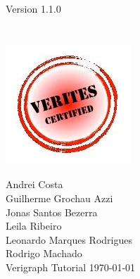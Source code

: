 \documentclass[12pt]{article}
\newcommand{\verigraphversion}[0]{1.1.0}
\begin{document}
\begin{titlepage}
Version \verigraphversion \\[0.4cm] %
\HRule \\[1.0cm]
 




\center {\today}\\[2cm]
\includegraphics[scale = 0.7]{img/logos/LogoVerites.jpg}

 

\begin{titlepage}
\vfill
\begin{flushleft} 
{\large Andrei Costa \\
Guilherme Grochau Azzi \\
Jonas Santos Bezerra \\
Leila Ribeiro \\
Leonardo Marques Rodrigues \\
Rodrigo Machado } \\ [5cm] 
{\Huge Verigraph Tutorial}
\vfill
\today
\end{flushleft}
\end{titlepage}


\end{titlepage}
\end{document}
